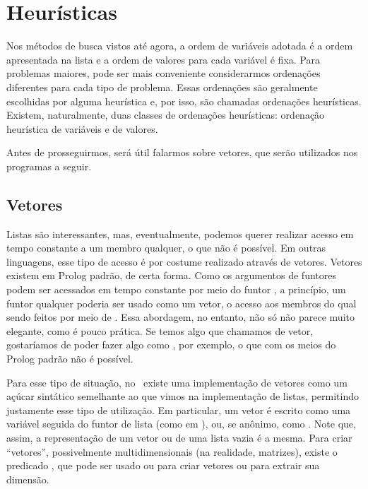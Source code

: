 
%

%

\section{Heurísticas}

Nos métodos de busca vistos até agora, a ordem de variáveis adotada é
a ordem apresentada na lista e a ordem de valores para cada variável é
fixa. Para problemas maiores, pode ser mais conveniente considerarmos
ordenações diferentes para cada tipo de problema. Essas ordenações são
geralmente escolhidas por alguma heurística e, por isso, são chamadas
ordenações heurísticas. Existem, naturalmente, duas classes de
ordenações heurísticas: ordenação heurística de variáveis e de
valores.

Antes de prosseguirmos, será útil falarmos sobre vetores, que serão
utilizados nos programas a seguir.

\subsection{Vetores}

Listas são interessantes, mas, eventualmente, podemos querer realizar
acesso em tempo constante a um membro qualquer, o que não é
possível. Em outras linguagens, esse tipo de acesso é por costume
realizado através de vetores. Vetores existem em Prolog padrão, de
certa forma. Como os argumentos de funtores podem ser acessados em
tempo constante por meio do funtor , a princípio, um
funtor qualquer poderia ser usado como um vetor, o acesso aos membros
do qual sendo feitos por meio de . Essa abordagem, no
entanto, não só não parece muito elegante, como é pouco prática.  Se
temos algo que chamamos de vetor, gostaríamos de poder fazer algo como
, por exemplo, o que com os meios do Prolog
padrão não é possível.

Para esse tipo de situação, no \eclipse\ existe uma implementação de
vetores como um açúcar sintático semelhante ao que vimos na
implementação de listas, permitindo justamente esse tipo de
utilização. Em particular, um vetor é escrito como uma variável
seguida do funtor de lista (como em ), ou, se anônimo,
como . Note que, assim, a representação de um
vetor ou de uma lista vazia é a mesma. Para criar ``vetores'',
possivelmente multidimensionais (na realidade, matrizes), existe o
predicado , que pode ser usado ou para criar vetores ou
para extrair sua dimensão.

